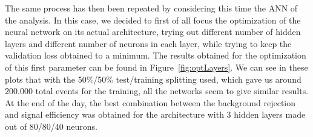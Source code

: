 \documentclass[a4paper, 10pt, openright]{report}
\begin{document}
\begin{appendices}
The same process has then been repeated by considering this time the \ac{ANN} of the analysis. In this case, we decided to first of all focus the optimization of the neural network on its actual architecture, trying out different number of hidden layers and different number of neurons in each layer, while trying to keep the validation loss obtained to a minimum. The results obtained for the optimization of this first parameter can be found in Figure~\ref{fig:optLayers}. We can see in these plots that with the 50\%/50\% test/training splitting used, which gave us around 200.000 total events for the training, all the networks seem to give similar results. At the end of the day, the best combination between the background rejection and signal efficiency was obtained for the architecture with 3 hidden layers made out of 80/80/40 neurons.



\end{appendices}
\end{document}
